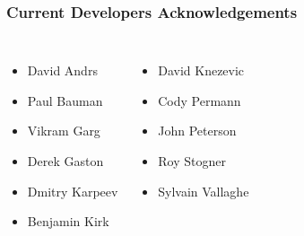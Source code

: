 \documentclass[mathserif]{beamer}
\begin{document}
\begin{frame}
\frametitle{Current Developers Acknowledgements}

\begin{columns}


\begin{itemize}
\item David Andrs
\item Paul Bauman
\item Vikram Garg
\item Derek Gaston
\item Dmitry Karpeev 
\item Benjamin Kirk
\end{itemize}

\begin{itemize}
\item David Knezevic
\item Cody Permann
\item John Peterson 
\item Roy Stogner
\item Sylvain Vallaghe
\end{itemize}

\end{columns}

\begin{columns}[c] 
\begin{column}{.5\textwidth} 
\begin{block}{}
\end{block}
\end{column}
\end{columns}
\begin{center}
\end{center}
\end{frame}

 
\end{document}
